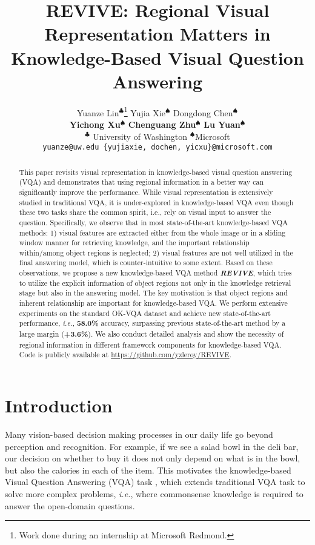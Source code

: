 \documentclass{article}
\title{REVIVE: Regional Visual Representation Matters in Knowledge-Based Visual Question Answering}
\author{
  Yuanze Lin$^\clubsuit$\thanks{Work done during an internship at Microsoft Redmond.} \quad\quad Yujia Xie$^\spadesuit$ \quad\quad Dongdong Chen$^\spadesuit$ \quad\\ \textbf{Yichong Xu}$^\spadesuit$ \quad\quad \textbf{Chenguang Zhu}$^\spadesuit$ \quad\quad \textbf{Lu Yuan}$^\spadesuit$ \\
  $^\clubsuit$ University of Washington \quad\quad $^\spadesuit$Microsoft \\
{\tt\small{yuanze@uw.edu} \quad\quad\quad  \tt\small{\{yujiaxie, dochen, yicxu\}@microsoft.com}}
}
\begin{document}
\maketitle

\begin{abstract}
This paper revisits visual representation in knowledge-based visual question answering (VQA) and demonstrates that using regional information in a better way can significantly improve the performance. While visual representation is extensively studied in  traditional VQA, it is under-explored in knowledge-based VQA even though these two tasks share the common spirit, i.e., rely on visual input to answer the question. Specifically, we observe that in most state-of-the-art knowledge-based VQA methods: 1) visual features are  extracted either from the whole image or in a sliding window manner for retrieving knowledge, and the important relationship within/among object regions is neglected; 2) visual features are not well utilized in the final answering model, which is counter-intuitive to some extent. Based on these observations, we propose a new knowledge-based VQA method \textbf{\textit{REVIVE}}, which tries to utilize the explicit information of object regions not only in the knowledge retrieval stage but also in the answering model. The key motivation is that object regions and inherent relationship are important for knowledge-based VQA. We perform extensive experiments on the standard OK-VQA dataset and achieve new state-of-the-art performance, \textit{i.e.}, \textbf{58.0\%} accuracy, surpassing previous state-of-the-art method by a large margin (\textbf{+3.6\%}). We also conduct detailed analysis and show the necessity of regional information in different framework components for knowledge-based VQA. Code is publicly available at \url{https://github.com/yzleroy/REVIVE}.

\end{abstract}


\section{Introduction}
Many vision-based decision making processes in our daily life go beyond perception and recognition. For example, if we see a salad bowl in the deli bar, our decision on whether to buy it does not only depend on what is in the bowl, but also the calories in each of the item. This motivates the knowledge-based Visual Question Answering (VQA) task \cite{marino2019ok}, which extends traditional VQA task \cite{antol2015vqa}  to solve more complex problems, \textit{i.e.}, where commonsense knowledge is required to answer the open-domain questions. 
\end{document}
